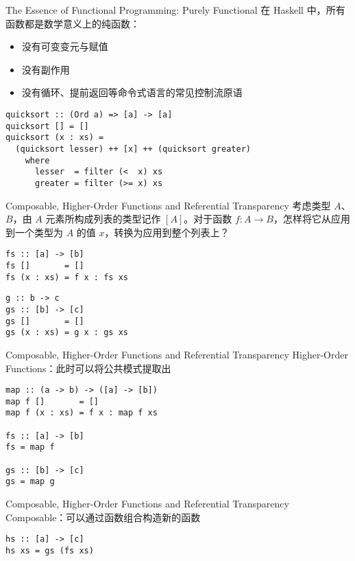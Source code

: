 \documentclass{beamer}
\begin{document}
\begin{frame}[fragile]{The Essence of Functional Programming: Purely Functional}
在 Haskell 中，所有函数都是数学意义上的纯函数：
\begin{itemize}
    \item 没有可变变元与赋值
    \item 没有副作用
    \item 没有循环、提前返回等命令式语言的常见控制流原语
\end{itemize}
\begin{verbatim}
quicksort :: (Ord a) => [a] -> [a]
quicksort [] = []
quicksort (x : xs) =
  (quicksort lesser) ++ [x] ++ (quicksort greater)
    where
      lesser  = filter (<  x) xs
      greater = filter (>= x) xs
\end{verbatim}
\end{frame}

\begin{frame}[fragile]{Composable, Higher-Order Functions and Referential Transparency}
考虑类型 $A$、$B$，由 $A$ 元素所构成列表的类型记作 $[A]$。对于函数 $f : A \to B$，怎样将它从应用到一个类型为 $A$ 的值 $x$，转换为应用到整个列表上？
\pause
\begin{verbatim}
fs :: [a] -> [b]
fs []       = []
fs (x : xs) = f x : fs xs
\end{verbatim}
\pause
\begin{verbatim}
g :: b -> c
gs :: [b] -> [c]
gs []       = []
gs (x : xs) = g x : gs xs
\end{verbatim}
\end{frame}

\begin{frame}[fragile]{Composable, Higher-Order Functions and Referential Transparency}
Higher-Order Functions：此时可以将公共模式提取出
\begin{verbatim}
map :: (a -> b) -> ([a] -> [b])
map f []       = []
map f (x : xs) = f x : map f xs

fs :: [a] -> [b]
fs = map f

gs :: [b] -> [c]
gs = map g
\end{verbatim}
\end{frame}

\begin{frame}[fragile]{Composable, Higher-Order Functions and Referential Transparency}
Composable：可以通过函数组合构造新的函数
\begin{verbatim}
hs :: [a] -> [c]
hs xs = gs (fs xs)
\end{verbatim}
\end{frame}
\end{document}
